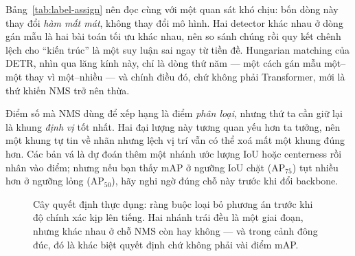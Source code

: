 \documentclass[../../../deep_learning.tex]{subfiles}
\begin{document}
Bảng~\ref{tab:label-assign} nên đọc cùng với một quan sát khó chịu: bốn dòng này thay đổi \emph{hàm mất mát}, không thay đổi mô hình. Hai detector khác nhau ở dòng gán mẫu là hai bài toán tối ưu khác nhau, nên so sánh chúng rồi quy kết chênh lệch cho ``kiến trúc'' là một suy luận sai ngay từ tiền đề. 
Hungarian matching của DETR, nhìn qua lăng kính này, chỉ là dòng thứ năm --- một cách gán mẫu một--một thay vì một--nhiều --- và chính điều đó, chứ không phải Transformer, mới là thứ khiến NMS trở nên thừa.

\begin{cambay}
Điểm số mà NMS dùng để xếp hạng là điểm \emph{phân loại}, nhưng thứ ta cần giữ lại là khung \emph{định vị} tốt nhất. Hai đại lượng này tương quan yếu hơn ta tưởng, nên một khung tự tin về nhãn nhưng lệch vị trí vẫn có thể xoá mất một khung đúng hơn. Các bản vá là dự đoán thêm một nhánh ước lượng IoU hoặc centerness rồi nhân vào điểm; nhưng nếu bạn thấy mAP ở ngưỡng IoU chặt (\(\mathrm{AP}_{75}\)) tụt nhiều hơn ở ngưỡng lỏng (\(\mathrm{AP}_{50}\)), hãy nghi ngờ đúng chỗ này trước khi đổi backbone.
\end{cambay}


\begin{figure}[H]\centering
{}
\caption{Cây quyết định thực dụng: ràng buộc loại bỏ phương án trước khi độ chính xác kịp lên tiếng. Hai nhánh trái đều là một giai đoạn, nhưng khác nhau ở chỗ NMS còn hay không --- và trong cảnh đông đúc, đó là khác biệt quyết định chứ không phải vài điểm mAP.}
\label{fig:cay-chon-detector}
\end{figure}
\end{document}
